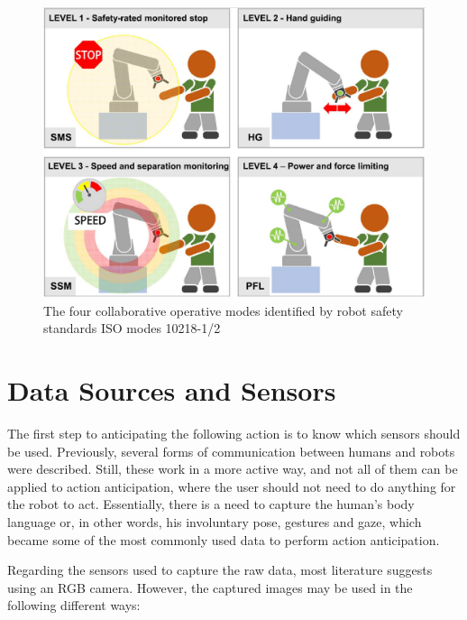 \begin{figure}[ht]
\centerline{\includegraphics[width=5in]{figs/iso.png}}
\caption[The four collaborative operative modes identified by robot safety standards ISO modes 10218-1/2]{The four collaborative operative modes identified by robot safety standards ISO modes 10218-1/2 \cite{Villani2018}}
\label{isonorms}
\end{figure}

\section{Data Sources and Sensors}

The first step to anticipating the following action is to know which sensors should be used. Previously, several forms of communication between humans and robots were described. Still, these work in a more active way, and not all of them can be applied to action anticipation, where the user should not need to do anything for the robot to act. Essentially, there is a need to capture the human's body language or, in other words, his involuntary pose, gestures and gaze, which became some of the most commonly used data to perform action anticipation.

Regarding the sensors used to capture the raw data, most literature suggests using an RGB camera. However, the captured images may be used in the following different ways:

